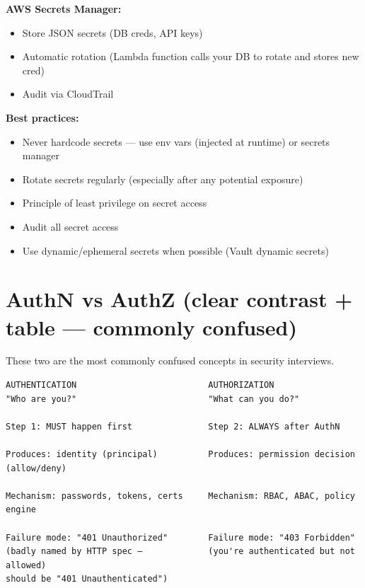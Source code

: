 \documentclass[11pt]{article}
\providecommand{\tightlist}{\setlength{\itemsep}{1pt}\setlength{\parskip}{0pt}}
\begin{document}
\textbf{AWS Secrets Manager:}

\begin{itemize}
\tightlist
\item
  Store JSON secrets (DB creds, API keys)
\item
  Automatic rotation (Lambda function calls your DB to rotate and stores new cred)
\item
  Audit via CloudTrail
\end{itemize}

\textbf{Best practices:}

\begin{itemize}
\tightlist
\item
  Never hardcode secrets --- use env vars (injected at runtime) or secrets manager
\item
  Rotate secrets regularly (especially after any potential exposure)
\item
  Principle of least privilege on secret access
\item
  Audit all secret access
\item
  Use dynamic/ephemeral secrets when possible (Vault dynamic secrets)
\end{itemize}

\section{AuthN vs AuthZ (clear contrast + table --- commonly confused)}\label{authn-vs-authz-clear-contrast--table--commonly-confused}

These two are the most commonly confused concepts in security interviews.

\setcodelang{}

\begin{verbatim}
AUTHENTICATION                          AUTHORIZATION
"Who are you?"                          "What can you do?"

Step 1: MUST happen first               Step 2: ALWAYS after AuthN

Produces: identity (principal)          Produces: permission decision (allow/deny)

Mechanism: passwords, tokens, certs     Mechanism: RBAC, ABAC, policy engine

Failure mode: "401 Unauthorized"        Failure mode: "403 Forbidden"
(badly named by HTTP spec —             (you're authenticated but not allowed)
should be "401 Unauthenticated")
\end{verbatim}
\end{document}
